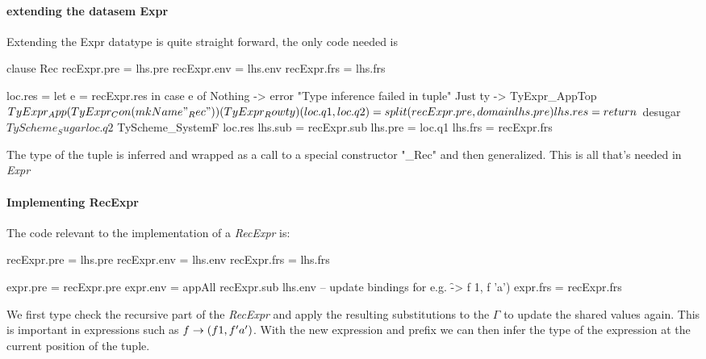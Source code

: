 \paragraph{extending the datasem Expr}
Extending the Expr datatype is quite straight forward, the only code needed is

\begin{code}
    clause Rec
       recExpr.pre = lhs.pre
       recExpr.env = lhs.env
       recExpr.frs = lhs.frs
       
       loc.res = let e = recExpr.res
                 in case e of
                      Nothing -> error "Type inference failed in tuple"
                      Just ty -> TyExpr_AppTop $
                                    TyExpr_App
                                       (TyExpr_Con (mkName "_Rec"))
                                       (TyExpr_Row ty)
       
       (loc.q1, loc.q2) = split (recExpr.pre, domain lhs.pre)
       lhs.res = return $ desugar $ TyScheme_Sugar loc.q2 $ TyScheme_SystemF loc.res
       lhs.sub = recExpr.sub
       lhs.pre = loc.q1
       lhs.frs = recExpr.frs
\end{code}
The type of the tuple is inferred and wrapped as a call to a special constructor "\_Rec" and then generalized. This is all that's needed in \emph{Expr}

\paragraph{Implementing RecExpr}
The code relevant to the implementation of a \emph{RecExpr} is:

\begin{code}
       recExpr.pre = lhs.pre
       recExpr.env = lhs.env
       recExpr.frs = lhs.frs
       
       expr.pre = recExpr.pre
       expr.env = appAll recExpr.sub lhs.env -- update bindings for e.g. \f -> f 1, f 'a')
       expr.frs = recExpr.frs
\end{code}
We first type check the recursive part of the \emph{RecExpr} and apply the resulting substitutions to the $\Gamma$ to update the shared values again. This is important in expressions such as $\\f \rightarrow (f 1, f 'a')$. With the new expression and prefix we can then infer the type of the expression at the current position of the tuple.

